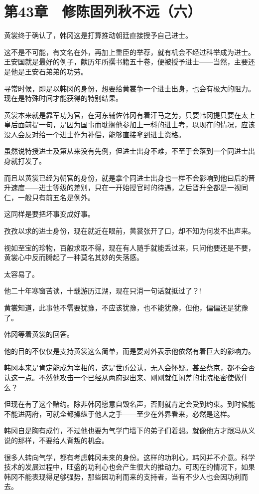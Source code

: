 \section{第43章　修陈固列秋不远（六）}

黄裳终于确认了，韩冈这是打算推动朝廷直接授予自己进士。

这不是不可能，有文名在外，再加上重臣的举荐，就有机会不经过科举成为进士。王安国就是最好的例子，献历年所撰书籍五十卷，便被授予进士——当然，主要还是他是王安石弟弟的功劳。

寻常时候，即是以韩冈的身份，想要给黄裳争一个进士出身，也会有极大的阻力。现在是特殊时间才能获得的特别结果。

黄裳本来就是靠军功为官，在河东辅佐韩冈有着汗马之劳，只要韩冈提只要在太上皇后面前提一句，是因为国事而耽搁他参加上一科的进士考，以现在的情况，应该没人会反对给一个进士作为补偿，能够直接拿到进士资格。

虽然说特授进士及第从来没有先例，但进士出身不难，不至于会落到一个同进士出身就打发了。

而且以黄裳已经为朝官的身份，就是拿个同进士出身也一样不会影响到他曰后的晋升速度——进士等级的差别，只在一开始授官时的待遇，之后晋升全都是一视同仁，一般只有前五名是例外。

这同样是要把坏事变成好事。

孜孜以求的进士身份，现在就近在眼前，黄裳张开了口，却不知为何发不出声来。

视如至宝的珍物，百般求取不得，现在有人随手就能丢过来，只问他要还是不要，黄裳心中反而腾起了一种莫名其妙的失落感。

太容易了。

他二十年寒窗苦读，十载游历江湖，现在只消一句话就抵过了？!

黄裳知道，此事他不需要犹豫，不应该犹豫，也不能犹豫，但他，偏偏还是犹豫了。

韩冈等着黄裳的回答。

他的目的不仅仅是支持黄裳这么简单，而是要对外表示他依然有着巨大的影响力。

韩冈本来是肯定能成为宰相的，这是世所公认，无人会怀疑。甚至蔡京，都不会否认这一点。不然他攻击一个已经从两府退出来、刚刚就任闲差的北院枢密使做什么？

但现在有了这个赌约。除非韩冈愿意自毁名声，否则就肯定会受到约束。到时候能不能进两府，可就全都操纵于他人之手——至少在外界看来，必然是这样。

韩冈自是胸有成竹，不过他也要为气学门墙下的弟子们着想。就像他方才跟冯从义说的那样，不要给人背叛的机会。

很多人转向气学，都有考虑韩冈未来的身份。这样的功利心，韩冈并不介意。科学技术的发展过程中，旺盛的功利心也会产生很大的推动力。可现在的情况下，如果韩冈不能表现得足够强势，那些因功利而来的支持者，当有不少人也会因功利而去。

